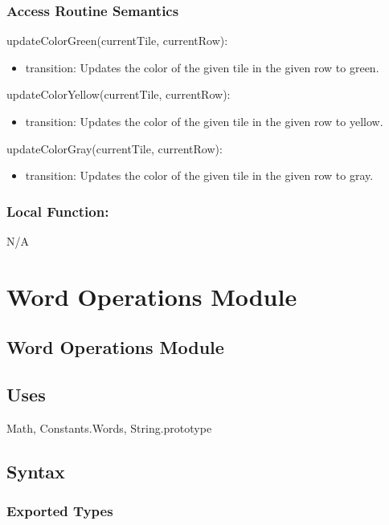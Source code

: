 \documentclass[12pt]{article}
\begin{document}
\subsubsection* {Access Routine Semantics}

\noindent updateColorGreen(currentTile, currentRow):
\begin{itemize}
  \item transition: Updates the color of the given tile in the given row to green.
\end{itemize}

\noindent updateColorYellow(currentTile, currentRow):
\begin{itemize}
  \item transition: Updates the color of the given tile in the given row to yellow.
\end{itemize}

\noindent updateColorGray(currentTile, currentRow):
\begin{itemize}
  \item transition: Updates the color of the given tile in the given row to gray.
\end{itemize}
\subsubsection*{Local Function:}

N/A

\newpage 

\section {Word Operations Module}

\subsection* {Word Operations Module}

\subsection* {Uses}

Math, Constants.Words, String.prototype

\subsection* {Syntax}

\subsubsection* {Exported Types}
\end{document}
